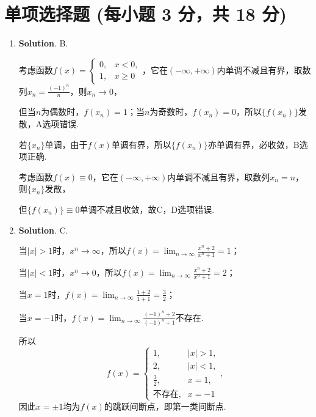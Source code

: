 \documentclass[../main.tex]{subfiles}
\begin{document}
\section{单项选择题 (每小题 3 分，共 18 分)}
\begin{enumerate}
    \item \textbf{Solution}. B.

          考虑函数$f(x)=
              \begin{cases}
                  0, & x<0,   \\
                  1, & x\geq0
              \end{cases}$，它在$(-\infty,+\infty)$内单调不减且有界，取数列$x_{n}=\frac{(-1)^{n}}{n}$，则$x
                  _{n}\to0$，

          但当$n$为偶数时，$f(x_{n})=1$；当$n$为奇数时，$f(x_{n})=0$，所以$\{f(x_{n})
              \}$发散，A选项错误.

          若$\{x_{n}\}$单调，由于$f(x)$单调有界，所以$\{f(x_{n})\}$亦单调有界，必收敛，B选项正确.

          考虑函数$f(x)\equiv0$，它在$(-\infty,+\infty)$内单调不减且有界，取数列$x_{n}
              =n$，则$\{x_{n}\}$发散，

          但$\{f(x_{n})\}\equiv0$单调不减且收敛，故C，D选项错误.

    \item \textbf{Solution}. C.

          当$|x|>1$时，$x^{n}\to\infty$，所以$f(x)=\lim_{n\to\infty}\frac{x^{n}+2}{x^{n}+1}
              =1$；

          当$|x|<1$时，$x^{n}\to0$，所以$f(x)=\lim_{n\to\infty}\frac{x^{n}+2}{x^{n}+1}
              =2$；

          当$x=1$时，$f(x)=\lim_{n\to\infty}\frac{1+2}{1+1}=\frac{3}{2}$；

          当$x=-1$时，$f(x)=\lim_{n\to\infty}\frac{(-1)^{n}+2}{(-1)^{n}+1}$不存在.

          所以
          \[
              f(x)=
              \begin{cases}
                  1,           & |x|>1, \\
                  2,           & |x|<1, \\
                  \frac{3}{2}, & x=1,   \\
                  \text{不存在},  & x=-1
              \end{cases},
          \]
          因此$x=\pm1$均为$f(x)$的跳跃间断点，即第一类间断点.


\end{enumerate}
\end{document}
